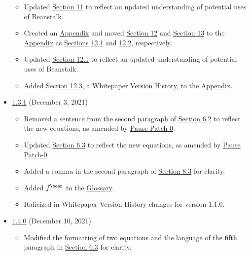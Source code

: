 \documentclass[class=article, crop=false]{standalone}
\begin{document}
\begin{itemize}[topsep=0pt, itemsep=3pt,leftmargin=16pt]
\begin{itemize}
        \item Updated \hyperlink{section.11}{Section 11} to reflect an updated understanding of potential uses of Beanstalk. 
        \item Created an \hyperlink{section.12}{Appendix} and moved \hyperlink{subsection.12.1}{Section 12} and \hyperlink{subsection.12.2}{Section 13} to the \hyperlink{section.12}{Appendix} as \hyperlink{section.12}{Sections} \hyperlink{subsection.12.1}{12.1} and \hyperlink{subsection.12.2}{12.2}, respectively. 
        \item Updated \hyperlink{subsection.12.1}{Section 12.1} to reflect an updated understanding of potential uses of Beanstalk. 
        \item Added \hyperlink{subsection.12.3}{Section 12.3}, a Whitepaper Version History, to the \hyperlink{section.12}{Appendix}.
    \newpage
    \end{itemize}
    \item \href{https://github.com/BeanstalkFarms/Beanstalk/blob/master/version-history/beanstalk1_3_1.pdf}{1.3.1} (December 3, 2021)
    \begin{itemize}
        \item Removed a sentence from the second paragraph of \hyperlink{subsection.6.2}{Section 6.2} to reflect the new  equations, as amended by \href{https://snapshot.org/\#/beanstalkfarms.eth/proposal/0xffc6033eb5a4e53f4da5df1c4011bacc12244914885fe11e6a6f2d09d856feed}{Pause Patch-0}.
        \item Updated \hyperlink{subsection.6.3}{Section 6.3} to reflect the new  equations, as amended by \href{https://snapshot.org/\#/beanstalkfarms.eth/proposal/0xffc6033eb5a4e53f4da5df1c4011bacc12244914885fe11e6a6f2d09d856feed}{Pause Patch-0}.
        \item Added a comma in the second paragraph of \hyperlink{subsection.8.3}{Section 8.3} for clarity.
        \item Added $f^{\bean}$ to the \hyperlink{subsection.12.2}{Glossary}. 
        \item Italicized  in Whitepaper Version History changes for version 1.1.0.
    \end{itemize}
    \item \href{https://github.com/BeanstalkFarms/Beanstalk/blob/master/version-history/beanstalk1_4_0.pdf}{1.4.0} (December 10, 2021)
    \begin{itemize}
        \item Modified the formatting of two equations and the language of the fifth paragraph in \hyperlink{subsection.6.3}{Section 6.3} for clarity.

\end{itemize}
\end{itemize}
\end{document}

